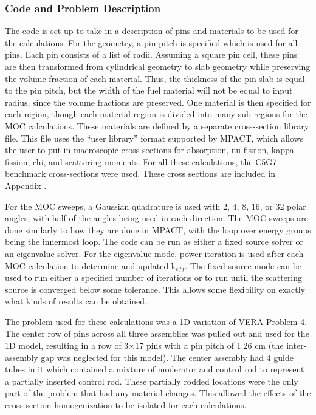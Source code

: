 \subsubsection{Code and Problem Description}

The code is set up to take in a description of pins and materials to be used for the calculations.  For the geometry, a pin pitch is specified which is used for all pins.  Each pin consists of a list of radii.  Assuming a square pin cell, these pins are then transformed from cylindrical geometry to slab geometry while preserving the volume fraction of each material.  Thus, the thickness of the pin slab is equal to the pin pitch, but the width of the fuel material will not be equal to input radius, since the volume fractions are preserved.  One material is then specified for each region, though each material region is divided into many sub-regions for the MOC calculations.  These materials are defined by a separate cross-section library file.  This file uses the ``user library'' format supported by MPACT, which allows the user to put in macroscopic cross-sections for absorption, nu-fission, kappa-fission, chi, and scattering moments.  For all these calculations, the C5G7 benchmark cross-sections  were used.  These cross sections are included in Appendix .

For the MOC sweeps, a Gaussian quadrature \cite{HandbookOfMathFunctions1972} is used with 2, 4, 8, 16, or 32 polar angles, with half of the angles being used in each direction.  The MOC sweeps are done similarly to how they are done in MPACT, with the loop over energy groups being the innermost loop.  The code can be run as either a fixed source solver or an eigenvalue solver.  For the eigenvalue mode, power iteration is used after each MOC calculation to determine and updated k$_{eff}$.  The fixed source mode can be used to run either a specified number of iterations or to run until the scattering source is converged below some tolerance.  This allows some flexibility on exactly what kinds of results can be obtained.

The problem used for these calculations was a 1D variation of VERA Problem 4.  The center row of pins across all three assemblies was pulled out and used for the 1D model, resulting in a row of 3$\times$17 pins with a pin pitch of 1.26 cm (the inter-assembly gap was neglected for this model).  The center assembly had 4 guide tubes in it which contained a mixture of moderator and control rod to represent a partially inserted control rod.  These partially rodded locations were the only part of the problem that had any material changes.  This allowed the effects of the cross-section homogenization to be isolated for each calculations.

